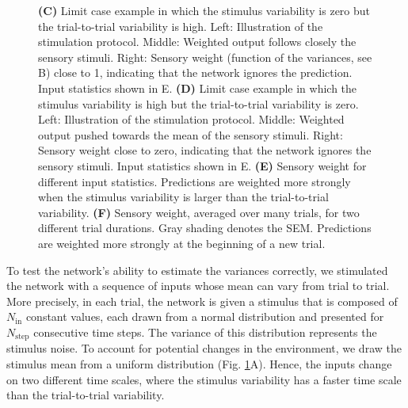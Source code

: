 \documentclass[10pt,a4paper]{article}
\begin{document}
\begin{figure}[t!]
{{\bf (C)} Limit case example in which the stimulus variability is zero but the trial-to-trial variability is high. Left: Illustration of the stimulation protocol. Middle: Weighted output follows closely the sensory stimuli. Right: Sensory weight (function of the variances, see B) close to 1, indicating that the network ignores the prediction. Input statistics shown in E.
{\bf (D)} Limit case example in which the stimulus variability is high but the trial-to-trial variability is zero. Left: Illustration of the stimulation protocol. Middle: Weighted output pushed towards the mean of the sensory stimuli. Right: Sensory weight close to zero, indicating that the network ignores the sensory stimuli. Input statistics shown in E.
{\bf (E)} Sensory weight for different input statistics. Predictions are weighted more strongly when the stimulus variability is larger than the trial-to-trial variability.
{\bf (F)} Sensory weight, averaged over many trials, for two different trial durations. Gray shading denotes the SEM. Predictions are weighted more strongly at the beginning of a new trial. 
}
\label{fig:Fig_3}
\end{figure}
%

To test the network's ability to estimate the variances correctly, we stimulated the network with a sequence of inputs whose mean can vary from trial to trial. More precisely, in each trial, the network is given a stimulus that is composed of $N_\mathrm{in}$ constant values, each drawn from a normal distribution and presented for $N_\mathrm{step}$ consecutive time steps. The variance of this distribution represents the stimulus noise. To account for potential changes in the environment, we draw the stimulus mean from a uniform distribution (Fig. \ref{fig:Fig_3}A). Hence, the inputs change on two different time scales, where the stimulus variability has a faster time scale than the trial-to-trial variability.
\end{document}
